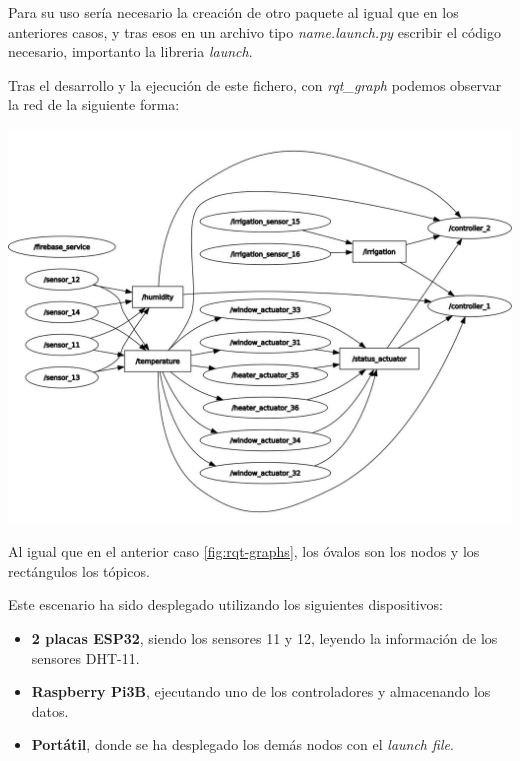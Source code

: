 Para su uso sería necesario la creación de otro paquete al igual que en los anteriores casos, y tras esos en un archivo tipo \textit{name.launch.py} escribir el código necesario, importanto la libreria \textit{launch}.

Tras el desarrollo y la ejecución de este fichero, con \textit{rqt\_graph} podemos observar la red de la siguiente forma:

\newpage

 \begin{center}
    \centering
    \includegraphics[width=\textwidth]{img/06-Rqt-graph.jpeg}
    \label{fig:simulacion-escenario-nodos}
\end{center}

Al igual que en el anterior caso \ref{fig:rqt-graphs}, los óvalos son los nodos y los rectángulos los tópicos.

Este escenario ha sido desplegado utilizando los siguientes dispositivos:

\begin{itemize}
    \item \textbf{2 placas ESP32}, siendo los sensores 11 y 12, leyendo la información de los sensores DHT-11.
    \item \textbf{Raspberry Pi3B}, ejecutando uno de los controladores y almacenando los datos.
    \item \textbf{Portátil}, donde se ha desplegado los demás nodos con el \textit{launch file}.
\end{itemize}

